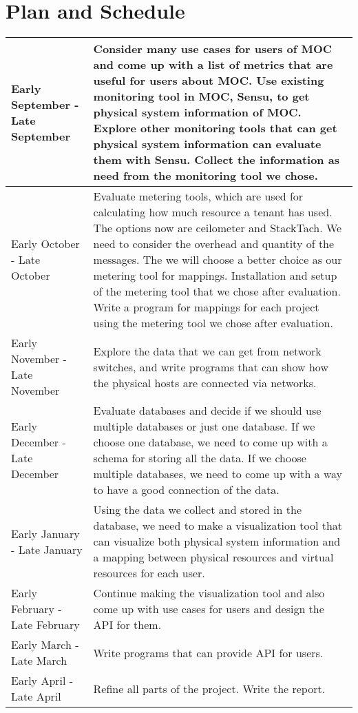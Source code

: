 \documentclass[11pt, oneside]{article}   	%
\begin{document}
\section{Plan and Schedule}
	\begin{center}
	\begin{tabular}{| m{4cm} | m{12cm} |}
	\hline 
	Early September - Late September & Consider many use cases for users of MOC and come up with a list of metrics that are useful for users about MOC. Use existing monitoring tool in MOC, Sensu, to get physical system information of MOC. Explore other monitoring tools that can get physical system information can evaluate them with Sensu. Collect the information as need from the monitoring tool we chose.\\
	\hline
	Early October - Late October & Evaluate metering tools, which are used for calculating how much resource a tenant has used. The options now are ceilometer and StackTach. We need to consider the overhead and quantity of the messages. The we will choose a better choice as our metering tool for mappings. Installation and setup of the metering tool that we chose after evaluation. Write a program for mappings for each project using the metering tool we chose after evaluation.\\
	\hline
	Early November - Late November  &  Explore the data that we can get from network switches, and write programs that can show how the physical hosts are connected via networks. \\
	\hline
	Early December - Late December &  Evaluate databases and decide if we should use multiple databases or just one database. If we choose one database, we need to come up with a schema for storing all the data. If we choose multiple databases, we need to come up with a way to have a good connection of the data. \\
	\hline
	Early January - Late January &  Using the data we collect and stored in the database, we need to make a visualization tool that can visualize both physical system information and a mapping between physical resources and virtual resources for each user. \\
	\hline
	Early February - Late February & Continue making the visualization tool and also come up with use cases for users and design the API for them. \\
	\hline
	Early March - Late March & Write programs that can provide API for users. \\
	\hline
	Early April - Late April &  Refine all parts of the project. Write the report.\\
	\hline
	\end{tabular}
	\end{center}
\end{document}
